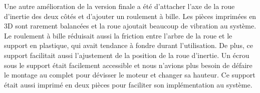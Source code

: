 \newpage

Une autre amélioration de la version finale a été d'attacher l’axe de la roue d’inertie des deux côtés et d’ajouter un roulement à bille.
Les pièces imprimées en 3D sont rarement balancées et la roue ajoutait beaucoup de vibration au système.
Le roulement à bille réduisait aussi la friction entre l’arbre de la roue et le support en plastique, qui avait tendance à fondre durant l’utilisation.
De plus, ce support facilitait aussi l’ajustement de la position de la roue d’inertie.
Un écrou sous le support était facilement accessible et nous n’avions plus besoin de défaire le montage au complet pour dévisser le moteur et changer sa hauteur.
Ce support était aussi imprimé en deux pièces pour faciliter son implémentation au système.

\begin{figure}[h!]
    \centering
    

\end{figure}
